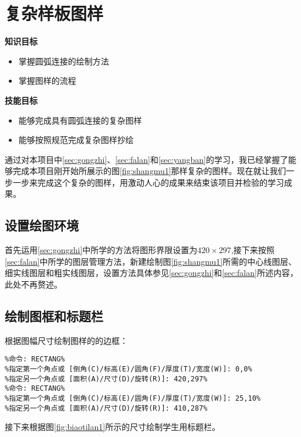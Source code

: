 \section{复杂样板图样}

{\bfseries 知识目标}
\begin{itemize}
\item 掌握圆弧连接的绘制方法
\item 掌握图样的流程
\end{itemize}

{\bfseries 技能目标}
\begin{itemize}
\item 能够完成具有圆弧连接的复杂图样
\item 能够按照规范完成复杂图样抄绘
\end{itemize}

通过对本项目中\ref{sec:gongzhi}、\ref{sec:falan}和\ref{sec:yangban}的学习，我已经掌握了能够完成本项目刚开始所展示的图\ref{fig:shangmu1}那样复杂的图样。现在就让我们一步一步来完成这个复杂的图样，用激动人心的成果来结束该项目并检验的学习成果。
\subsection{设置绘图环境}
首先运用\ref{sec:gongzhi}中所学的方法将图形界限设置为$420\times 297$,接下来按照\ref{sec:falan}中所学的图层管理方法，新建绘制图\ref{fig:shangmu1}所需的中心线图层、细实线图层和粗实线图层，设置方法具体参见\ref{sec:gongzhi}和\ref{sec:falan}所述内容，此处不再赘述。
\subsection{绘制图框和标题栏}
根据图幅尺寸绘制图样的的边框：
\begin{lstlisting}
%命令: RECTANG%
%指定第一个角点或 [倒角(C)/标高(E)/圆角(F)/厚度(T)/宽度(W)]: 0,0%
%指定另一个角点或 [面积(A)/尺寸(D)/旋转(R)]: 420,297%
%命令: RECTANG%
%指定第一个角点或 [倒角(C)/标高(E)/圆角(F)/厚度(T)/宽度(W)]: 25,10%
%指定另一个角点或 [面积(A)/尺寸(D)/旋转(R)]: 410,287%
\end{lstlisting}
接下来根据图\ref{fig:biaotilan1}所示的尺寸绘制学生用标题栏。

